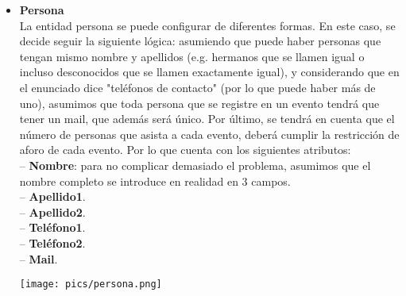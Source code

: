 \documentclass[12pt]{article}
\begin{document}
\begin{itemize}
        \item \textbf{Persona}\\
            La entidad persona se puede configurar de diferentes formas. En este caso, se decide seguir la siguiente lógica:
            asumiendo que puede haber personas que tengan mismo nombre y apellidos (e.g. hermanos que se llamen igual o incluso 
            desconocidos que se llamen exactamente igual), y considerando que en el enunciado dice "teléfonos de contacto" (por lo que puede haber más de uno),
            asumimos que toda persona que se registre en un evento tendrá que tener un mail, que además será único. 
            Por último, se tendrá en cuenta que el número de personas que asista a cada evento, deberá cumplir la restricción de aforo de cada evento.
            Por lo que cuenta con los siguientes atributos: \\
                \hspace{0.5cm} -- {\bfseries Nombre}: para no complicar demasiado el problema, asumimos que el nombre completo se introduce en realidad en 3 campos. \\
                \hspace{0.5cm} -- {\bfseries Apellido1}. \\
                \hspace{0.5cm} -- {\bfseries Apellido2}. \\
                \hspace{0.5cm} -- {\bfseries Teléfono1}. \\
                \hspace{0.5cm} -- {\bfseries Teléfono2}. \\
                \hspace{0.5cm} -- {\bfseries Mail}. \\
            \begin{center}
            {\texttt{[image: pics/persona.png]}}
            \end{center}
        

\end{itemize}
\end{document}
